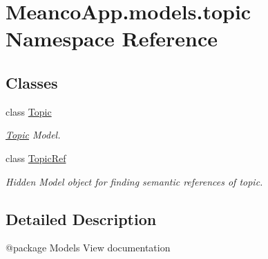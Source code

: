 \hypertarget{namespace_meanco_app_1_1models_1_1topic}{}\section{Meanco\+App.\+models.\+topic Namespace Reference}
\label{namespace_meanco_app_1_1models_1_1topic}
\subsection*{Classes}
\begin{DoxyCompactItemize}
\item 
class \hyperlink{class_meanco_app_1_1models_1_1topic_1_1_topic}{Topic}
\begin{DoxyCompactList}\small\item\em \hyperlink{class_meanco_app_1_1models_1_1topic_1_1_topic}{Topic} Model. \end{DoxyCompactList}\item 
class \hyperlink{class_meanco_app_1_1models_1_1topic_1_1_topic_ref}{Topic\+Ref}
\begin{DoxyCompactList}\small\item\em Hidden Model object for finding semantic references of topic. \end{DoxyCompactList}\end{DoxyCompactItemize}


\subsection{Detailed Description}
\begin{DoxyVerb}@package Models
View documentation\end{DoxyVerb}
 